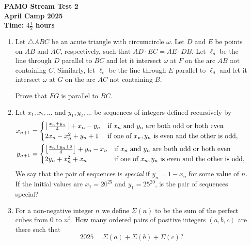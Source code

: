 \documentclass[12pt]{article}
\begin{document}
\thispagestyle{empty}

\begin{center}
  \textbf{\Large PAMO Stream Test 2}
  \\ \vspace{1em}
  \textbf{\large April Camp 2025}
  \\ \vspace{1em}
  \textbf{\large Time: $4\frac{1}{2}$ hours}
\end{center}


\begin{enumerate}[leftmargin=0pt,topsep=2\bigskipamount,itemsep=\medskipamount]

\item Let $\triangle ABC$ be an acute triangle with circumcircle $\omega$. Let $D$ and $E$ be points on $AB$ and $AC$, respectively, such that $AD\cdot EC = AE\cdot DB$. Let $\ell_d$ be the line through $D$ parallel to $BC$ and let it intersect $\omega$ at $F$ on the arc $AB$ not containing $C$. Similarly, let $\ell_e$ be the line through $E$ parallel to $\ell_d$ and let it intersect $\omega$ at $G$ on the arc $AC$ not containing $B$.

\vspace{0.2cm}
Prove that $FG$ is parallel to $BC$.

\item Let $x_1,x_2,\dotsc$ and $y_1,y_2,\dotsc$ be sequences of integers defined recursively by
\begin{align*}
    x_{n+1} &= \begin{cases*}
        \left\lfloor \frac{x_n+y_n}{4} \right\rfloor +x_n -y_n & if $x_n$ and $y_n$ are both odd or both even \\
        2x_n -x_n^2 +y_n +1 & if one of $x_n,y_n$ is even and the other is odd,
    \end{cases*} \\
    y_{n+1} &= \begin{cases*}
        \left\lfloor \frac{x_n+y_n+2}{4} \right\rfloor +y_n -x_n & if $x_n$ and $y_n$ are both odd or both even \\
        2y_n +x_n^2 +x_n & if one of $x_n,y_n$ is even and the other is odd,
    \end{cases*}
\end{align*}
We say that the pair of sequences is \emph{special} if $y_n = 1-x_n$ for some value of $n$.
If the initial values are $x_1 = 20^{25}$ and $y_1 = 25^{20}$, is the pair of sequences special?

\item For a non-negative integer $n$ we define $\Sigma (n)$ to be the sum of the perfect cubes from $0$ to $n^3$.
How many ordered pairs of positive integers $(a, b, c)$ are there such that 
\[
2025 = \Sigma (a) + \Sigma (b) + \Sigma (c)?
\]

\end{enumerate}
\end{document}
